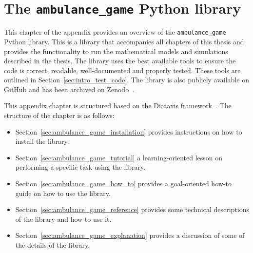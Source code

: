 \chapter{The \texttt{ambulance\_game} Python library}
\label{appendix:ambulance_game}

This chapter of the appendix provides an overview of the
\texttt{ambulance\_game} Python library.
This is a library that accompanies all chapters of this thesis and provides
the functionality to run the mathematical models and simulations described
in the thesis.
The library uses the best available tools to ensure the code is correct,
readable, well-documented and properly tested.
These tools are outlined in Section~\ref{sec:intro_test_code}.
The library is also publicly available on GitHub and has been archived on
Zenodo~\cite{ambulance_game_github_repo}.

This appendix chapter is structured based on the Diataxis
framework~\cite{Procida_Diataxis_documentation_framework}.
The structure of the chapter is as follows:

\begin{itemize}
    \item Section~\ref{sec:ambulance_game_installation} provides instructions
        on how to install the library.
    \item Section~\ref{sec:ambulance_game_tutorial} a learning-oriented lesson
        on performing a specific task using the library.
    \item Section~\ref{sec:ambulance_game_how_to} provides a goal-oriented
        how-to guide on how to use the library.
    \item Section~\ref{sec:ambulance_game_reference} provides some technical
        descriptions of the library and how to use it.
    \item Section~\ref{sec:ambulance_game_explanation} provides a discussion
        of some of the details of the library.
\end{itemize}











